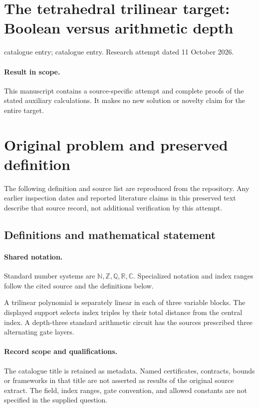 \documentclass[11pt]{article}
\begin{document}
\section*{The tetrahedral trilinear target: Boolean versus arithmetic depth}
\noindent catalogue entry; catalogue entry. Research attempt dated 11 October 2026.
\paragraph{Result in scope.}This manuscript contains a source-specific attempt and complete proofs of the stated auxiliary calculations. It makes no new solution or novelty claim for the entire target.
\section{Original problem and preserved definition}
The following definition and source list are reproduced from the repository. Any earlier inspection dates and reported literature claims in this preserved text describe that source record, not additional verification by this attempt.
\subsection{Definitions and mathematical statement}

\paragraph{Shared notation.}Standard number systems are $\mathbb N,\mathbb Z,\mathbb Q,\mathbb R,\mathbb C$. Specialized notation and index ranges follow the cited source and the definitions below.


A trilinear polynomial is separately linear in each of three variable blocks. The displayed support selects index triples by their total distance from the central index. A depth-three standard arithmetic circuit has the source\textquotesingle s prescribed three alternating gate layers.
\paragraph{Record scope and qualifications.}
The catalogue title is retained as metadata. Named certificates, contracts, bounds or frameworks in that title are not asserted as results of the original source extract.
The field, index ranges, gate convention, and allowed constants are not specified in the supplied question.
\end{document}
